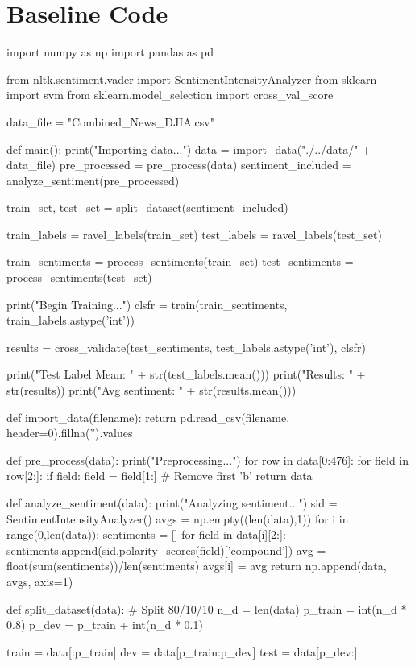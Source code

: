 \documentclass{article} %
\begin{document}
\section{Baseline Code}

\begin{python}
import numpy as np
import pandas as pd

from nltk.sentiment.vader import SentimentIntensityAnalyzer
from sklearn import svm
from sklearn.model_selection import cross_val_score

data_file = "Combined_News_DJIA.csv"

def main():
  print("Importing data...")
  data = import_data("./../data/" + data_file)
  pre_processed = pre_process(data)
  sentiment_included = analyze_sentiment(pre_processed)

  train_set, test_set = split_dataset(sentiment_included)

  train_labels = ravel_labels(train_set)
  test_labels = ravel_labels(test_set)

  train_sentiments = process_sentiments(train_set)
  test_sentiments = process_sentiments(test_set)

  print("Begin Training...")
  clsfr = train(train_sentiments, train_labels.astype('int'))

  results = cross_validate(test_sentiments, test_labels.astype('int'), clsfr)

  print("Test Label Mean: " + str(test_labels.mean()))
  print("Results: " + str(results))
  print("Avg sentiment: " + str(results.mean()))

def import_data(filename):
  return pd.read_csv(filename, header=0).fillna('').values

def pre_process(data):
  print("Preprocessing...")
  for row in data[0:476]:
    for field in row[2:]:
      if field:
        field = field[1:] # Remove first 'b'
  return data

def analyze_sentiment(data):
  print("Analyzing sentiment...")
  sid = SentimentIntensityAnalyzer()
  avgs = np.empty((len(data),1))
  for i in range(0,len(data)):
    sentiments = []
    for field in data[i][2:]:
      sentiments.append(sid.polarity_scores(field)['compound'])
    avg = float(sum(sentiments))/len(sentiments)
    avgs[i] = avg
  return np.append(data, avgs, axis=1)

def split_dataset(data):
  # Split 80/10/10
  n_d = len(data)
  p_train = int(n_d * 0.8)
  p_dev = p_train + int(n_d * 0.1)

  train = data[:p_train]
  dev = data[p_train:p_dev]
  test = data[p_dev:]


\end{python}
\end{document}
